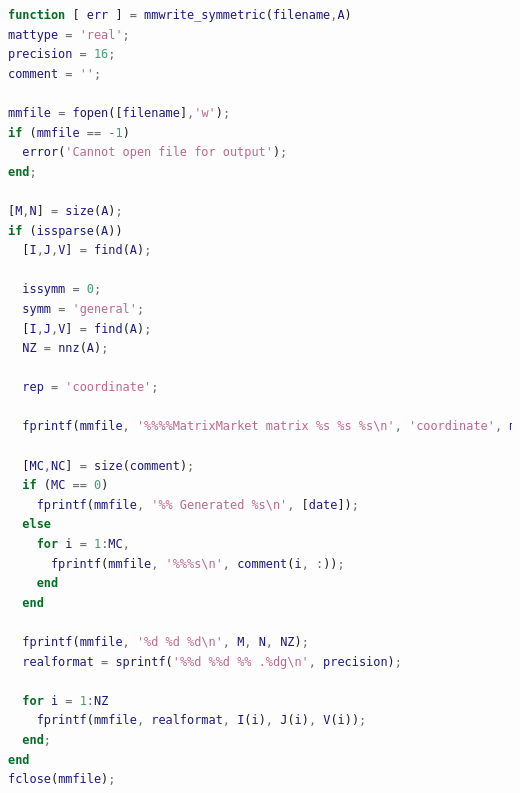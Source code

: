 \documentclass[11pt,italian]{article}
\begin{document}
\newpage
\begin{lstlisting}[language=MatLab,basicstyle=\footnotesize\ttfamily,caption=Funzione di conversione da \lstinline{.mat} a \lstinline{.mtx} per matrici simmetriche]
function [ err ] = mmwrite_symmetric(filename,A)
mattype = 'real';
precision = 16;
comment = '';

mmfile = fopen([filename],'w');
if (mmfile == -1)
  error('Cannot open file for output');
end;

[M,N] = size(A);
if (issparse(A))
  [I,J,V] = find(A);

  issymm = 0;
  symm = 'general';
  [I,J,V] = find(A);
  NZ = nnz(A);

  rep = 'coordinate';

  fprintf(mmfile, '%%%%MatrixMarket matrix %s %s %s\n', 'coordinate', mattype, symm);

  [MC,NC] = size(comment);
  if (MC == 0)
    fprintf(mmfile, '%% Generated %s\n', [date]);
  else
    for i = 1:MC,
      fprintf(mmfile, '%%%s\n', comment(i, :));
    end
  end

  fprintf(mmfile, '%d %d %d\n', M, N, NZ);
  realformat = sprintf('%%d %%d %% .%dg\n', precision);

  for i = 1:NZ
    fprintf(mmfile, realformat, I(i), J(i), V(i));
  end;
end
fclose(mmfile);
\end{lstlisting}

\label{section:code}
\end{document}
